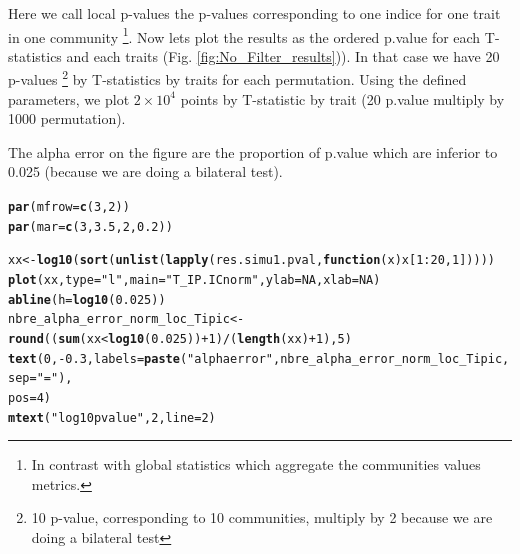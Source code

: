 \documentclass[12pt]{article}\usepackage[]{graphicx}\usepackage[]{color}
\makeatletter
\newcommand{\hlnum}[1]{\textcolor[rgb]{0.686,0.059,0.569}{#1}}%
\newcommand{\hlstr}[1]{\textcolor[rgb]{0.192,0.494,0.8}{#1}}%
\newcommand{\hlopt}[1]{\textcolor[rgb]{0,0,0}{#1}}%
\newcommand{\hlstd}[1]{\textcolor[rgb]{0.345,0.345,0.345}{#1}}%
\newcommand{\hlkwa}[1]{\textcolor[rgb]{0.161,0.373,0.58}{\textbf{#1}}}%
\newcommand{\hlkwb}[1]{\textcolor[rgb]{0.69,0.353,0.396}{#1}}%
\newcommand{\hlkwc}[1]{\textcolor[rgb]{0.333,0.667,0.333}{#1}}%
\newcommand{\hlkwd}[1]{\textcolor[rgb]{0.737,0.353,0.396}{\textbf{#1}}}%
\newenvironment{kframe}{%
 \def\at@end@of@kframe{}%
 \ifinner\ifhmode%
  \def\at@end@of@kframe{\end{minipage}}%
  \begin{minipage}{\columnwidth}%
 \fi\fi%
 \def\FrameCommand##1{\hskip\@totalleftmargin \hskip-\fboxsep
 \colorbox{shadecolor}{##1}\hskip-\fboxsep
     \hskip-\linewidth \hskip-\@totalleftmargin \hskip\columnwidth}%
 \MakeFramed {\advance\hsize-\width
   \@totalleftmargin\z@ \linewidth\hsize
   \@setminipage}}%
 {\par\unskip\endMakeFramed%
 \at@end@of@kframe}
\newenvironment{knitrout}{}{} %
\makeatother
\begin{document}
Here we call local p-values the p-values corresponding to one indice for one trait in one community \footnote{In contrast with global statistics which aggregate the communities values metrics.}. Now lets plot the results as the ordered p.value for each T-statistics and each traits (Fig. \ref{fig:No_Filter_results})). In that case we have 20 p-values \footnote{10 p-value, corresponding to 10 communities, multiply by 2 because we are doing a bilateral test} by T-statistics by traits for each permutation. Using the defined parameters, we plot \ensuremath{2\times 10^{4}} points by T-statistic by trait (20 p.value multiply by 1000 permutation). 

The alpha error on the figure are the proportion of p.value which are inferior to 0.025 (because we are doing a bilateral test).

\begin{knitrout}\small
{}\color{fgcolor}\begin{kframe}
\begin{alltt}
\hlkwd{par}\hlstd{(}\hlkwc{mfrow} \hlstd{=} \hlkwd{c}\hlstd{(}\hlnum{3}\hlstd{,} \hlnum{2}\hlstd{))}
\hlkwd{par}\hlstd{(}\hlkwc{mar} \hlstd{=} \hlkwd{c}\hlstd{(}\hlnum{3}\hlstd{,} \hlnum{3.5}\hlstd{,} \hlnum{2}\hlstd{,} \hlnum{0.2}\hlstd{))}

\hlstd{xx} \hlkwb{<-} \hlkwd{log10}\hlstd{(}\hlkwd{sort}\hlstd{(}\hlkwd{unlist}\hlstd{(}\hlkwd{lapply}\hlstd{(res.simu1.pval,} \hlkwa{function}\hlstd{(}\hlkwc{x}\hlstd{) x[}\hlnum{1}\hlopt{:}\hlnum{20}\hlstd{,} \hlnum{1}\hlstd{]))))}
\hlkwd{plot}\hlstd{(xx,} \hlkwc{type} \hlstd{=} \hlstr{"l"}\hlstd{,} \hlkwc{main} \hlstd{=} \hlstr{"T_IP.IC norm"}\hlstd{,} \hlkwc{ylab} \hlstd{=} \hlnum{NA} \hlstd{,} \hlkwc{xlab} \hlstd{=} \hlnum{NA}\hlstd{)}
\hlkwd{abline}\hlstd{(}\hlkwc{h} \hlstd{=} \hlkwd{log10}\hlstd{(}\hlnum{0.025}\hlstd{))}
\hlstd{nbre_alpha_error_norm_loc_Tipic} \hlkwb{<-} \hlkwd{round}\hlstd{((}\hlkwd{sum}\hlstd{(xx} \hlopt{<} \hlkwd{log10}\hlstd{(}\hlnum{0.025}\hlstd{))} \hlopt{+}\hlnum{1} \hlstd{)} \hlopt{/} \hlstd{(}\hlkwd{length}\hlstd{(xx)}\hlopt{+}\hlnum{1}\hlstd{),} \hlnum{5}\hlstd{)}
\hlkwd{text}\hlstd{(}\hlnum{0}\hlstd{,} \hlopt{-}\hlnum{0.3}\hlstd{,} \hlkwc{labels} \hlstd{=} \hlkwd{paste}\hlstd{(}\hlstr{"alpha error"}\hlstd{, nbre_alpha_error_norm_loc_Tipic,} \hlkwc{sep} \hlstd{=} \hlstr{" = "}\hlstd{),}
     \hlkwc{pos} \hlstd{=} \hlnum{4}\hlstd{)}
\hlkwd{mtext}\hlstd{(}\hlstr{"log10 pvalue"}\hlstd{,} \hlnum{2}\hlstd{,} \hlkwc{line} \hlstd{=} \hlnum{2}\hlstd{)}


\end{alltt}
\end{kframe}
\end{knitrout}
\end{document}
